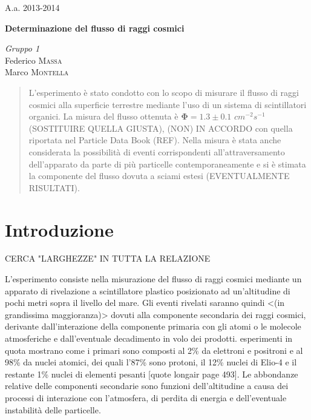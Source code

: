 \documentclass[11pt]{article}
\begin{document}
\printindex
\Large{A.a. 2013-2014}
\vspace{10cm}
\begin{center}
\Huge\textbf{Determinazione del flusso di raggi cosmici}
\end{center}

\vspace{2cm}
\begin{flushleft}
\textit{Gruppo \textsc{1}} \\
\medskip
Federico \textsc{Massa} \\ 
Marco \textsc{Montella}



\newpage

\begin{abstract}
\justify
L'esperimento è stato condotto con lo scopo di misurare il flusso di raggi cosmici alla superficie terrestre mediante l'uso di un sistema di scintillatori organici. La misura del flusso ottenuta è $\mathbf{\Phi} = 1.3 \pm 0.1$ $cm^{-2}s^{-1}$ (SOSTITUIRE QUELLA GIUSTA), (NON) IN ACCORDO con quella riportata nel Particle Data Book (REF). Nella misura è stata anche considerata la possibilità di eventi corrispondenti all'attraversamento dell'apparato da parte di più particelle contemporaneamente e si è stimata la componente del flusso dovuta a sciami estesi (EVENTUALMENTE RISULTATI). 

\end{abstract}
\bigskip

\section{Introduzione}
\justify

CERCA "LARGHEZZE" IN TUTTA LA RELAZIONE

L'esperimento consiste nella misurazione del flusso di raggi cosmici mediante un apparato di rivelazione a scintillatore plastico posizionato ad un'altitudine di pochi metri sopra il livello del mare. Gli eventi rivelati saranno quindi <(in grandissima maggioranza)> dovuti alla componente secondaria dei raggi cosmici, derivante dall'interazione della componente primaria con gli atomi o le molecole atmosferiche e dall'eventuale decadimento in volo dei prodotti.
esperimenti in quota mostrano come i primari sono composti al 2\% da elettroni e positroni e al 98\% da nuclei atomici, dei quali l'87\% sono protoni, il 12\% nuclei di Elio-4 e il restante 1\% nuclei di elementi pesanti [quote longair page 493].
Le abbondanze relative delle componenti secondarie sono funzioni dell'altitudine a causa dei processi di interazione con l'atmosfera, di perdita di energia e dell'eventuale instabilità delle particelle. 


\end{flushleft}
\end{document}

